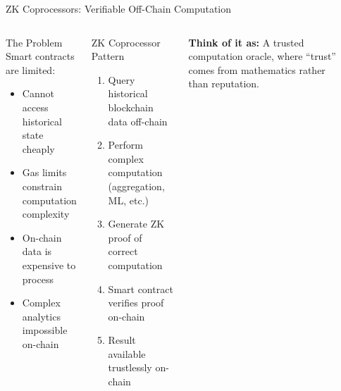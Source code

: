 \documentclass[8pt,aspectratio=169]{beamer}
\begin{document}
\begin{frame}{ZK Coprocessors: Verifiable Off-Chain Computation}
\begin{columns}[T]
\begin{block}{\footnotesize The Problem}
\footnotesize
Smart contracts are limited:
\begin{itemize}
\item Cannot access historical state cheaply
\item Gas limits constrain computation complexity
\item On-chain data is expensive to process
\item Complex analytics impossible on-chain
\end{itemize}
\end{block}
\vspace{0.1cm}
\begin{exampleblock}{\footnotesize ZK Coprocessor Pattern}
\footnotesize
\begin{enumerate}
\item Query historical blockchain data off-chain
\item Perform complex computation (aggregation, ML, etc.)
\item Generate ZK proof of correct computation
\item Smart contract verifies proof on-chain
\item Result available trustlessly on-chain
\end{enumerate}
\end{exampleblock}
\vspace{0.1cm}
\footnotesize
\textbf{Think of it as:} A trusted computation oracle, where ``trust'' comes from mathematics rather than reputation.
\begin{center}
\end{center}
\end{columns}
\end{frame}
\end{document}
